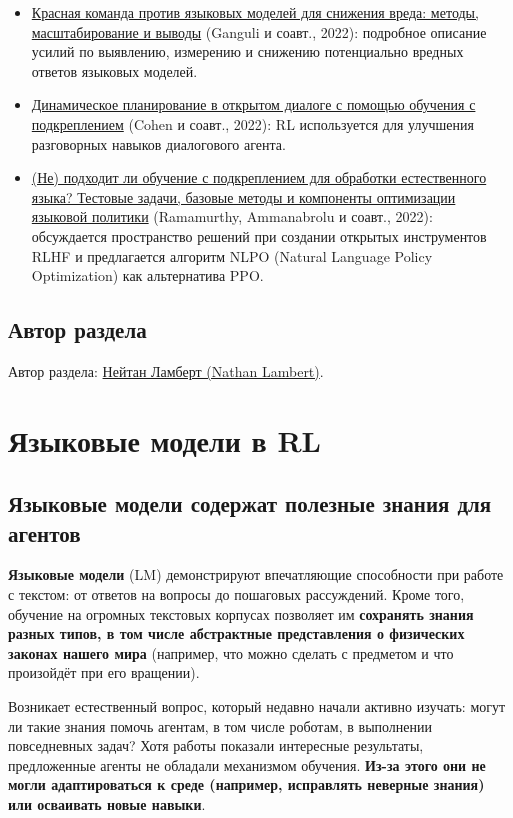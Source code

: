 \documentclass[11pt,a4paper]{article}
\begin{document}
\begin{itemize}
\item
  \href{https://arxiv.org/abs/2209.07858}{Красная команда против языковых моделей для снижения вреда: методы, масштабирование и выводы} (Ganguli и соавт., 2022): подробное описание усилий по выявлению, измерению и снижению потенциально вредных ответов языковых моделей.
\item
  \href{https://arxiv.org/abs/2208.02294}{Динамическое планирование в открытом диалоге с помощью обучения с подкреплением} (Cohen и соавт., 2022): RL используется для улучшения разговорных навыков диалогового агента.
\item
  \href{https://arxiv.org/abs/2210.01241}{(Не) подходит ли обучение с подкреплением для обработки естественного языка? Тестовые задачи, базовые методы и компоненты оптимизации языковой политики} (Ramamurthy, Ammanabrolu и соавт., 2022): обсуждается пространство решений при создании открытых инструментов RLHF и предлагается алгоритм NLPO (Natural Language Policy Optimization) как альтернатива PPO.
\end{itemize}

\subsection{Автор раздела}\label{author-4}

Автор раздела: \href{https://twitter.com/natolambert}{Нейтан Ламберт (Nathan Lambert)}.

\section{Языковые модели в RL}\label{language-models-in-rl}

\subsection{Языковые модели содержат полезные знания для агентов}\label{lms-encode-useful-knowledge-for-agents}

\textbf{Языковые модели} (LM) демонстрируют впечатляющие способности при работе с текстом: от ответов на вопросы до пошаговых рассуждений. Кроме того, обучение на огромных текстовых корпусах позволяет им \textbf{сохранять знания разных типов, в том числе абстрактные представления о физических законах нашего мира} (например, что можно сделать с предметом и что произойдёт при его вращении).

Возникает естественный вопрос, который недавно начали активно изучать: могут ли такие знания помочь агентам, в том числе роботам, в выполнении повседневных задач? Хотя работы показали интересные результаты, предложенные агенты не обладали механизмом обучения. \textbf{Из-за этого они не могли адаптироваться к среде (например, исправлять неверные знания) или осваивать новые навыки}.
\end{document}
